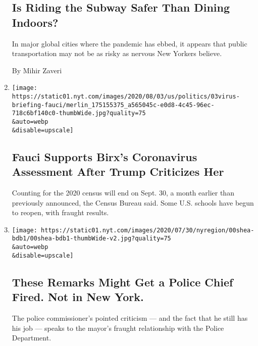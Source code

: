 \begin{enumerate}
  \hypertarget{is-riding-the-subway-safer-than-dining-indoors}{%
  \subsection{Is Riding the Subway Safer Than Dining
  Indoors?}\label{is-riding-the-subway-safer-than-dining-indoors}}

  In major global cities where the pandemic has ebbed, it appears that
  public transportation may not be as risky as nervous New Yorkers
  believe.

  By Mihir Zaveri
\item
  \href{/2020/08/03/world/coronavirus-covid-19.html}{}

  \texttt{[image: https://static01.nyt.com/images/2020/08/03/us/politics/03virus-briefing-fauci/merlin\_175155375\_a565045c-e0d8-4c45-96ec-718c6bf140c0-thumbWide.jpg?quality=75\\\&auto=webp\\\&disable=upscale]}

  \hypertarget{fauci-supports-birxs-coronavirus-assessment-after-trump-criticizes-her}{%
  \subsection{Fauci Supports Birx's Coronavirus Assessment After Trump
  Criticizes
  Her}\label{fauci-supports-birxs-coronavirus-assessment-after-trump-criticizes-her}}

  Counting for the 2020 census will end on Sept. 30, a month earlier
  than previously announced, the Census Bureau said. Some U.S. schools
  have begun to reopen, with fraught results.
\item
  \href{/2020/08/03/nyregion/police-shea-de-blasio-nyc.html}{}

  \texttt{[image: https://static01.nyt.com/images/2020/07/30/nyregion/00shea-bdb1/00shea-bdb1-thumbWide-v2.jpg?quality=75\\\&auto=webp\\\&disable=upscale]}

  \hypertarget{these-remarks-might-get-a-police-chief-fired-not-in-new-york}{%
  \subsection{These Remarks Might Get a Police Chief Fired. Not in New
  York.}\label{these-remarks-might-get-a-police-chief-fired-not-in-new-york}}

  The police commissioner's pointed criticism --- and the fact that he
  still has his job --- speaks to the mayor's fraught relationship with
  the Police Department.


\end{enumerate}
